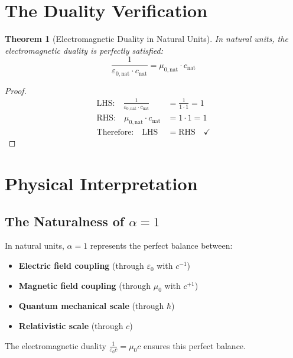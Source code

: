 \documentclass[12pt,a4paper]{article}
\newtheorem{theorem}{Theorem}[section]
\begin{document}
	\section{The Duality Verification}
	
	\begin{theorem}[Electromagnetic Duality in Natural Units]
		In natural units, the electromagnetic duality is perfectly satisfied:
		\begin{equation}
			\frac{1}{\varepsilon_{0,\text{nat}} \cdot c_{\text{nat}}} = \mu_{0,\text{nat}} \cdot c_{\text{nat}}
		\end{equation}
	\end{theorem}
	
	\begin{proof}
		\begin{align}
			\text{LHS:} \quad \frac{1}{\varepsilon_{0,\text{nat}} \cdot c_{\text{nat}}} &= \frac{1}{1 \cdot 1} = 1\\
			\text{RHS:} \quad \mu_{0,\text{nat}} \cdot c_{\text{nat}} &= 1 \cdot 1 = 1\\
			\text{Therefore:} \quad \text{LHS} &= \text{RHS} \quad \checkmark
		\end{align}
	\end{proof}
	
	\section{Physical Interpretation}
	
	\subsection{The Naturalness of $\alpha = 1$}
	
	\begin{tcolorbox}[colback=green!5!white,colframe=green!75!black,title=Key Physical Insight]
		In natural units, $\alpha = 1$ represents the perfect balance between:
		\begin{itemize}
			\item \textbf{Electric field coupling} (through $\varepsilon_0$ with $c^{-1}$)
			\item \textbf{Magnetic field coupling} (through $\mu_0$ with $c^{+1}$)
			\item \textbf{Quantum mechanical scale} (through $\hbar$)
			\item \textbf{Relativistic scale} (through $c$)
		\end{itemize}
		
		The electromagnetic duality $\frac{1}{\varepsilon_0 c} = \mu_0 c$ ensures this perfect balance.
	\end{tcolorbox}
	
\end{document}

